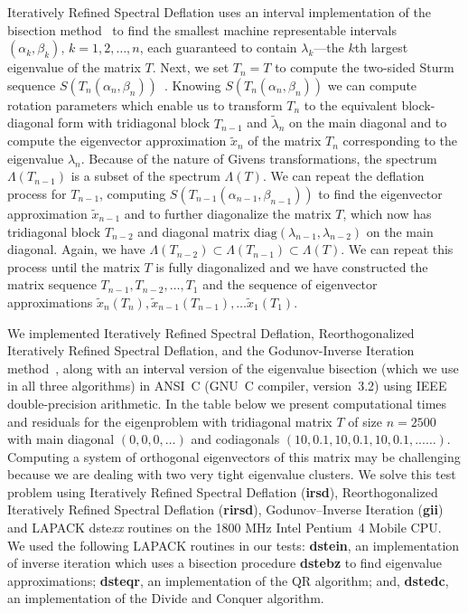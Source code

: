 \documentclass{report}
\begin{document}
Iteratively Refined Spectral Deflation uses an interval implementation of
the bisection method~\cite{garant:eng, matsekh_imacs} to find the
smallest machine representable intervals $(\alpha_k,
\beta_k),\,k=1, 2, \ldots, n$, each guaranteed to contain
$\lambda_k$---the $k$th largest eigenvalue of the matrix $T$.
Next, we set $T_n= T$ to compute the two-sided Sturm sequence
$S(T_n(\alpha_n, \beta_n))$~\cite{garant:eng, matsekh_imacs}.
Knowing $S(T_n(\alpha_n, \beta_n))$ we can compute rotation
parameters which enable us to transform $T_n$ to the equivalent
block-diagonal form with tridiagonal block $T_{n-1}$ and
$\tilde{\lambda}_n$ on the main diagonal and to compute the
eigenvector approximation $\tilde{x}_n$ of the matrix $T_n$
corresponding to the eigenvalue $\lambda_n$. Because of the
nature of Givens transformations, the spectrum $\Lambda(T_{n-1})$
is a subset of the spectrum $\Lambda(T)$. We can repeat the
deflation process for $T_{n-1}$, computing
$S(T_{n-1}(\alpha_{n-1}, \beta_{n-1}))$ to find the eigenvector
approximation $\tilde{x}_{n-1}$ and to further diagonalize the
matrix $T$, which now has tridiagonal block $T_{n-2}$ and
diagonal matrix $\mathrm{diag}(\lambda_{n-1}, \lambda_{n-2})$ on
the main diagonal. Again, we have $\Lambda(T_{n-2}) \subset
\Lambda(T_{n-1}) \subset \Lambda(T)$. We can repeat this process
until the matrix $T$ is fully diagonalized and we have
constructed the matrix sequence $T_{n-1}, T_{n-2}, \ldots, T_{1}$
and the sequence of eigenvector approximations $\tilde{x}_n(T_n),
\tilde{x}_{n-1}(T_{n-1}), \ldots \tilde{x}_1(T_1)$.


We implemented Iteratively Refined Spectral Deflation, Reorthogonalized
Iteratively Refined Spectral Deflation, and the Godunov-Inverse Iteration
method~\cite{matsekh_imacs}, along with an interval version of
the eigenvalue bisection (which we use in all three algorithms)
in ANSI~C (GNU~C compiler, version~3.2) using IEEE
double-precision arithmetic. In the table below we present
computational times and residuals for the eigenproblem with
tridiagonal matrix $T$ of size $n=2500$ with main diagonal $(0,
0, 0, \ldots)$ and codiagonals $(10, 0.1, 10, 0.1, 10, 0.1,
...\ldots)$. Computing a system of orthogonal eigenvectors of
this matrix may be challenging because we are dealing with two very
tight eigenvalue clusters. We solve this test problem using
Iteratively Refined Spectral Deflation (\textbf{irsd}), Reorthogonalized
Iteratively Refined Spectral Deflation (\textbf{rirsd}),
Godunov--Inverse Iteration (\textbf{gii}) and
LAPACK dste\emph{xx} routines on the 1800 MHz
Intel\textregistered{} Pentium~4 Mobile\textregistered{} CPU\@.
We used the following LAPACK routines in our tests:
\textbf{dstein}, an implementation of inverse iteration which
uses a bisection procedure \textbf{dstebz} to find eigenvalue
approximations; \textbf{dsteqr}, an implementation of the QR
algorithm; and, \textbf{dstedc}, an implementation of the Divide
and Conquer algorithm.
\end{document}
